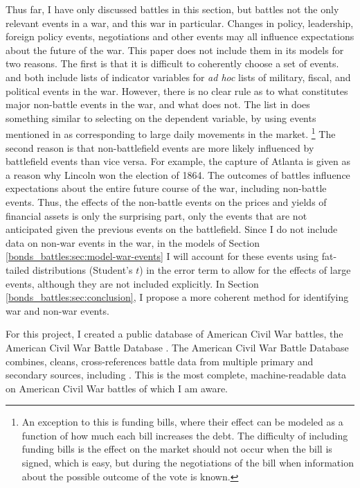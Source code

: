 Thus far, I have only discussed battles in this section, but battles not the only relevant events in a war, and this war in particular.
Changes in policy, leadership, foreign policy events, negotiations and other events may all influence expectations about the future of the war.
This paper does not include them in its models for two reasons.
The first is that it is difficult to coherently choose a set of events.
\textcite{McCandless1996} and \textcite{SmithSmith1997} both include lists of indicator variables for \textit{ad hoc} lists of military, fiscal, and political events in the war.
However, there is no clear rule as to what constitutes major non-battle events in the war, and what does not.
The list in \textcite{SmithSmith1997} does something similar to selecting on the dependent variable, by using events mentioned in \textcite{Mitchell1903} as corresponding to large daily movements in the market.%
\footnote{
  An exception to this is funding bills, where their effect can be modeled as a function of how much each bill increases the debt.
  The difficulty of including funding bills is the effect on the market should not occur when the bill is signed, which is easy, but during the negotiations of the bill when information about the possible outcome of the vote is known.
}
The second reason is that non-battlefield events are more likely influenced by battlefield events than vice versa.
For example, the capture of Atlanta is given as a reason why Lincoln won the election of 1864.
The outcomes of battles influence expectations about the entire future course of the war, including non-battle events.
Thus, the effects of the non-battle events on the prices and yields of financial assets is only the surprising part, only the events that are not anticipated given the previous events on the battlefield.
Since I do not include data on non-war events in the war, in the models of Section \ref{bonds_battles:sec:model-war-events} I will account for these events using fat-tailed distributions (Student's $t$) in the error term to allow for the effects of large events, although they are not included explicitly.
In Section \ref{bonds_battles:sec:conclusion}, I propose a more coherent method for identifying war and non-war events.

For this project, I created a public database of American Civil War battles, the American Civil War Battle Database \parencite{Arnold2015b}.
The American Civil War Battle Database combines, cleans, cross-references battle data from multiple primary and secondary sources, including \textcites{Phisterer1883}{Livermore1900}{Bodart1908}{dyer1908_war_rebel}{KennedyConservation1998}{CWSAC1993}{cwsac2012}.
This is the most complete, machine-readable data on American Civil War battles of which I am aware.



